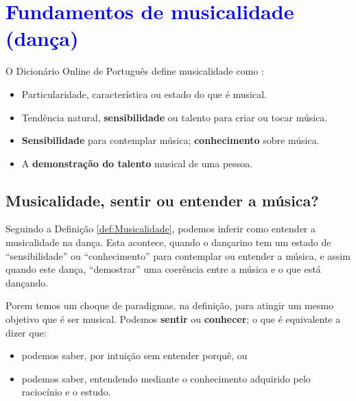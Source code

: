 
\chapter{\textcolor{blue}{Fundamentos de musicalidade (dança)}}

\begin{definition}[Musicalidade:] 
\label{def:Musicalidade}
O Dicionário Online de Português define musicalidade como \cite{diciomusicalidade}:
\begin{itemize}
\item Particularidade, característica ou estado do que é musical.
\item Tendência natural, \textbf{sensibilidade} ou talento para criar ou tocar música.
\item \textbf{Sensibilidade} para contemplar música; \textbf{conhecimento} sobre música.
\item A \textbf{demonstração do talento} musical de uma pessoa.
\end{itemize}
\end{definition}



\section{Musicalidade, sentir ou entender a música?}
Seguindo a Definição \ref{def:Musicalidade}, podemos inferir como entender a musicalidade na dança.
Esta acontece, quando o dançarino tem um estado de ``sensibilidade'' ou ``conhecimento'' para contemplar ou entender a música,
e assim quando este dança, ``demostrar'' uma coerência entre a música e o que está dançando.

Porem temos um choque de paradigmas, na definição, para atingir um mesmo objetivo que é ser musical.
Podemos \textbf{sentir} ou \textbf{conhecer}; o que é equivalente a dizer que:
\begin{itemize} 
\item podemos saber, por intuição sem entender porquê, ou
\item podemos saber, entendendo mediante o conhecimento adquirido pelo raciocínio e o estudo.\\
\end{itemize}



